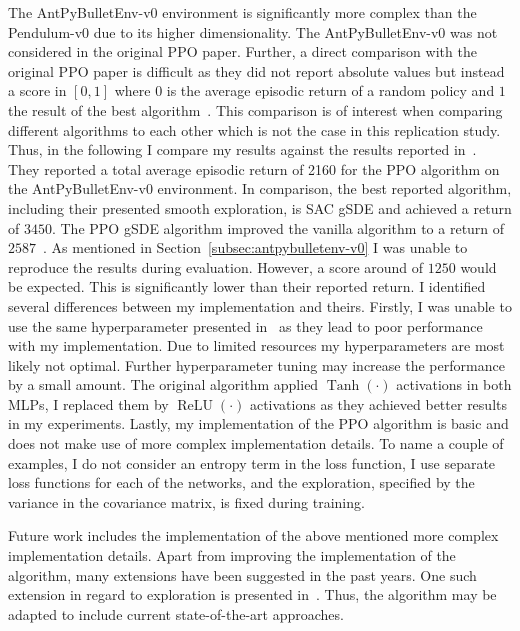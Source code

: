 The AntPyBulletEnv-v0 environment is significantly more complex than the Pendulum-v0 due to its higher dimensionality.
The AntPyBulletEnv-v0 was not considered in the original PPO paper.
Further, a direct comparison with the original PPO paper is difficult as they did not report absolute values but instead a score in
$[0, 1]$ where $0$ is the average episodic return of a random policy and $1$ the result of the best algorithm~\cite{schulman2017ppo}.
This comparison is of interest when comparing different algorithms to each other which is not the case in this replication study.
Thus, in the following I compare my results against the results reported in~\cite{Raffin2020}.
They reported a total average episodic return of 2160 for the PPO algorithm on the AntPyBulletEnv-v0 environment.
In comparison, the best reported algorithm, including their presented smooth exploration, is SAC gSDE and achieved a return of $3450$.
The PPO gSDE algorithm improved the vanilla algorithm to a return of $2587$~\cite{Raffin2020}.
As mentioned in Section~\ref{subsec:antpybulletenv-v0} I was unable to reproduce the results during evaluation.
However, a score around of $1250$ would be expected.
This is significantly lower than their reported return.
I identified several differences between my implementation and theirs.
Firstly, I was unable to use the same hyperparameter presented in~\cite{Raffin2020} as they lead to poor performance with
my implementation.
Due to limited resources my hyperparameters are most likely not optimal.
Further hyperparameter tuning may increase the performance by a small amount.
The original algorithm applied $\operatorname{Tanh}(\cdot)$ activations in both MLPs, I replaced them by
$\operatorname{ReLU}(\cdot)$ activations as they achieved better results in my experiments.
Lastly, my implementation of the PPO algorithm is basic and does not make use of more complex implementation details.
To name a couple of examples, I do not consider an entropy term in the loss function,
I use separate loss functions for each of the networks, and the exploration, specified by the variance in the covariance matrix,
is fixed during training.

Future work includes the implementation of the above mentioned more complex implementation details.
Apart from improving the implementation of the algorithm, many extensions have been suggested in the past years.
One such extension in regard to exploration is presented in~\cite{Raffin2020}.
Thus, the algorithm may be adapted to include current state-of-the-art approaches.


